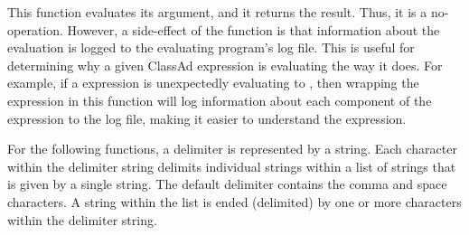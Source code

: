 \begin{description}
  \item[\Code{AnyType debug(AnyType expression)}]
     This function evaluates its argument, and it returns the result.
     Thus, it is a no-operation.
     However, a side-effect of the function is that information about
     the evaluation is logged to the evaluating program's log file.
     This is useful for determining why a given ClassAd expression
     is evaluating the way it does.  
     For example, if a   expression
     is unexpectedly evaluating to ,
     then wrapping the expression in this  function will
     log information about each component of the expression to the log file,
     making it easier to understand the expression.

\end{description}

For the following functions, a delimiter is represented by a string.
Each character within the delimiter string
delimits individual strings within a list of strings 
that is given by a single string.
The default delimiter contains the comma and space characters.
A string within the list is ended (delimited) by one or more
characters within the delimiter string.

